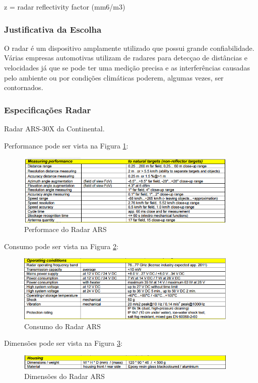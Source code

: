 z = radar reflectivity factor (mm6/m3)

\subsubsection{Justificativa da Escolha}

O radar é um dispositivo amplamente utilizado que possui grande confiabilidade.
Várias empresas automotivas utilizam de radares para detecçao de distâncias e
velocidades já que se pode ter uma medição precisa e as interferências causadas
pelo ambiente ou por condições climáticas poderem, algumas vezes, ser contornados.

\subsubsection{Especificações Radar}


Radar ARS-30X da Continental.

Performance pode ser vista na Figura \ref{fig:performace_radar}:
\begin{figure}[h]
  \centering
  \includegraphics[width=400px, scale=1]{figuras/performace_radar}
  \caption{Performace do Radar ARS}
\label{fig:performace_radar}
\end{figure}

Consumo pode ser vista na Figura \ref{fig:consumo_radar}:
\begin{figure}[h]
  \centering
  \includegraphics[width=400px, scale=1]{figuras/consumo_radar}
  \caption{Consumo do Radar ARS}
\label{fig:consumo_radar}
\end{figure}

Dimensões pode ser vista na Figura \ref{fig:dimensoes_radar}:
\begin{figure}[h]
  \centering
  \includegraphics[width=400px, scale=1]{figuras/dimensoes_radar}
  \caption{Dimensões do Radar ARS}
\label{fig:dimensoes_radar}
\end{figure}


